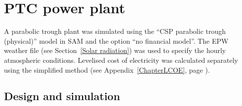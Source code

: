 \chapter{PTC power plant}

A parabolic trough plant was simulated using the \enquote{CSP parabolic trough (physical)} model in SAM and the option \enquote{no financial model}. The EPW weather file (see Section~\ref{Solar radiation}) was used to specify the hourly atmospheric conditions. 
Levelised cost of electricity was calculated separately using the simplified method (see Appendix~\ref{ChapterLCOE}, page \pageref{ChapterLCOE}).

\section{Design  and simulation} \label{PTC power plant design  and simulation}


